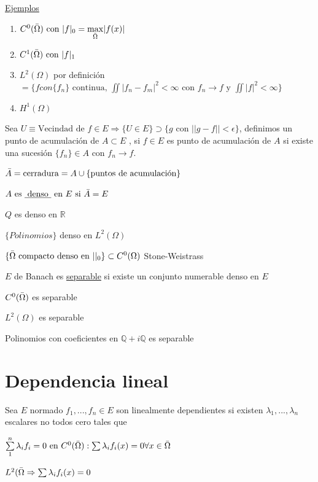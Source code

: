 \documentclass[a4paper,10pt]{book}
\begin{document}
\underline{Ejemplos}
\begin{enumerate}
    \item $C^0( \Bar{\Omega} ) \text{ con } |f|_{0} = \underset{\Bar{\Omega}}{\max} |f(x)| $
    \item $C^1(\Bar{\Omega} ) \text{ con } |f|_{1} $
    \item $L^2(\Omega)$ por definición   $ = \{ f con  \{ f_n\}  \text{ continua, }  \iint |f_n -f_m|^2 < \infty  \text{ con } f_n \rightarrow f  \text{ y } \iint |f|^2<\infty  \} $
    \item $H^1(\Omega)$
\end{enumerate}

Sea $U\equiv \text{Vecindad de } f \in E  \Rightarrow \{ U \in E \} \supset  \{ g \text{  con  } || g - f || < \epsilon \}$,
definimos un punto de acumulación de $A\subset E$ ,  si $f\in E $ es punto de acumulación de $A$ si 
existe una sucesión $ \{ f_n \} \in A $ con  $f_n\rightarrow f$.

$\Bar{A} = \text{cerradura}  = A \cup \{ \text{puntos de acumulación} \} $


$A \text{ es \underline{ denso } en } E \text{ si } \Bar{A}  = E $


$Q$ es denso en $\mathbb{R}$


$\{ Polinomios\} $ denso en $L^2(\Omega)$


$\{\Bar{\Omega} \text{ compacto denso en } | |_0  \} \subset  C^0(\Omega)$ Stone-Weistrass

 
$E$ de Banach es \underline{separable} si existe un conjunto numerable denso en $E$


$C^0(\Bar{\Omega})$ es separable 


$L^2(\Omega)$ es separable 

Polinomios con coeficientes en $\mathbb{Q}+i\mathbb{Q}$ es separable

\section{Dependencia lineal}

Sea $E$ normado $f_1,..., f_n \in E$ son linealmente dependientes si existen $\lambda_1,...,\lambda_n$ escalares no todos cero
tales que


$\sum\limits_1^n \lambda_i f_i =0 \text{ en } C^0(\Bar{ \Omega}) : \sum\limits \lambda_i f_i(x) =0 \forall x\in  \Bar{ \Omega}$

$L^2(\Bar{\Omega} \Rightarrow \sum\limits \lambda_i f_i(x) = 0 $ 
\end{document}
